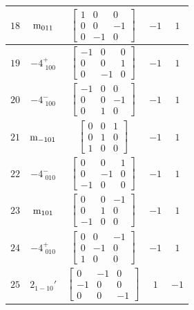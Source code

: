 \documentclass[fleqn,8pt]{jsarticle}
\begin{document}
\begin{longtable}{ccccc}
$ 18 $ & $ {\rm m}_{011} $ & $ \begin{bmatrix} 1 & 0 & 0 \\ 0 & 0 & -1 \\ 0 & -1 & 0 \end{bmatrix} $ & $ -1 $ & $ 1 $ \\ \hline
$ 19 $ & $ -4^{+}_{\,\,100} $ & $ \begin{bmatrix} -1 & 0 & 0 \\ 0 & 0 & 1 \\ 0 & -1 & 0 \end{bmatrix} $ & $ -1 $ & $ 1 $ \\ \hline
$ 20 $ & $ -4^{-}_{\,\,100} $ & $ \begin{bmatrix} -1 & 0 & 0 \\ 0 & 0 & -1 \\ 0 & 1 & 0 \end{bmatrix} $ & $ -1 $ & $ 1 $ \\ \hline
$ 21 $ & $ {\rm m}_{-101} $ & $ \begin{bmatrix} 0 & 0 & 1 \\ 0 & 1 & 0 \\ 1 & 0 & 0 \end{bmatrix} $ & $ -1 $ & $ 1 $ \\ \hline
$ 22 $ & $ -4^{-}_{\,\,010} $ & $ \begin{bmatrix} 0 & 0 & 1 \\ 0 & -1 & 0 \\ -1 & 0 & 0 \end{bmatrix} $ & $ -1 $ & $ 1 $ \\ \hline
$ 23 $ & $ {\rm m}_{101} $ & $ \begin{bmatrix} 0 & 0 & -1 \\ 0 & 1 & 0 \\ -1 & 0 & 0 \end{bmatrix} $ & $ -1 $ & $ 1 $ \\ \hline
$ 24 $ & $ -4^{+}_{\,\,010} $ & $ \begin{bmatrix} 0 & 0 & -1 \\ 0 & -1 & 0 \\ 1 & 0 & 0 \end{bmatrix} $ & $ -1 $ & $ 1 $ \\ \hline
$ 25 $ & $ 2{}_{1-10}{}' $ & $ \begin{bmatrix} 0 & -1 & 0 \\ -1 & 0 & 0 \\ 0 & 0 & -1 \end{bmatrix} $ & $ 1 $ & $ -1 $ \\ \hline

\end{longtable}
\end{document}
